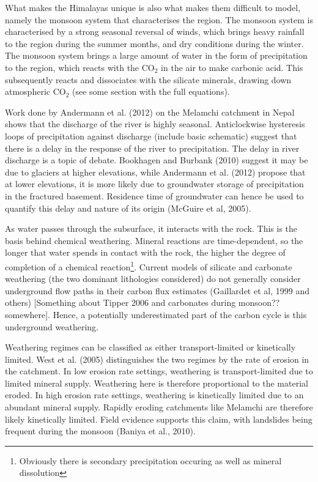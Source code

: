     
\bsk


What makes the Himalayas unique is also what makes them difficult to model, namely the monsoon system that characterises the region.
The monsoon system is characterised by a strong seasonal reversal of winds, which brings heavy rainfall to the region during the summer months, and dry conditions during the winter.
The monsoon system brings a large amount of water in the form of precipitation to the region, which reacts with the CO$_2$ in the air to make carbonic acid. This subsequently reacts and dissociates with the silicate minerals, drawing down atmospheric CO$_2$ (see some section with the full equations).

\bsk

Work done by Andermann et al. (2012) on the Melamchi catchment in Nepal shows that the discharge of the river is highly seasonal. Anticlockwise hysteresis loops of precipitation against discharge (include basic schematic) suggest that there is a delay in the response of the river to precipitation.  The delay in river discharge is a topic of debate. 
Bookhagen and Burbank (2010) suggest it may be due to glaciers at higher elevations, 
while Andermann et al. (2012) propose that at lower elevations, it is more likely due 
to groundwater storage of precipitation in the fractured basement. Residence time of groundwater can hence be used to quantify this delay and nature of its origin (McGuire et al, 2005).

\bsk

As water passes through the subsurface, it interacts with the rock. This is the basis behind chemical weathering. Mineral reactions are time-dependent, so the longer that water spends in contact with the rock, the higher the degree of completion of a chemical reaction\footnote{Obviously there is secondary precipitation occuring as well as mineral dissolution}. Current models of silicate and carbonate weathering (the two dominant lithologies considered) do not generally consider underground flow paths in their carbon flux estimates (Gaillardet et al, 1999 and others) [Something about Tipper 2006 and carbonates during monsoon?? somewhere]. Hence, a potentially underestimated part of the carbon cycle is this underground weathering.

\bsk

Weathering regimes can be classified as either transport-limited or kinetically limited. West et al. (2005) distinguishes the two regimes by the rate of erosion in the catchment. In low erosion rate settings, weathering is transport-limited due to limited mineral supply. Weathering here is therefore proportional to the material eroded. In high erosion rate settings, weathering is kinetically limited due to an abundant mineral supply. Rapidly eroding catchments like Melamchi are therefore likely kinetically limited. Field evidence supports this claim, with landslides being frequent during the monsoon (Baniya et al., 2010).

